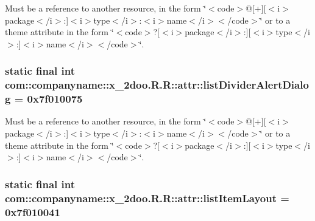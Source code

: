 Must be a reference to another resource, in the form \char`\"{}$<$code$>$@\mbox{[}+\mbox{]}\mbox{[}$<$i$>$package$<$/i$>$:\mbox{]}$<$i$>$type$<$/i$>$:$<$i$>$name$<$/i$>$$<$/code$>$\char`\"{} or to a theme attribute in the form \char`\"{}$<$code$>$?\mbox{[}$<$i$>$package$<$/i$>$:\mbox{]}\mbox{[}$<$i$>$type$<$/i$>$:\mbox{]}$<$i$>$name$<$/i$>$$<$/code$>$\char`\"{}. \hypertarget{classcom_1_1companyname_1_1x__2doo_1_1_r_1_1attr_3d36b2377163f3962672aaeabe780d8a}{
\subsubsection[{listDividerAlertDialog}]{\setlength{\rightskip}{0pt plus 5cm}static final int com::companyname::x\_\-2doo.R.R::attr::listDividerAlertDialog = 0x7f010075}}
\label{classcom_1_1companyname_1_1x__2doo_1_1_r_1_1attr_3d36b2377163f3962672aaeabe780d8a}


Must be a reference to another resource, in the form \char`\"{}$<$code$>$@\mbox{[}+\mbox{]}\mbox{[}$<$i$>$package$<$/i$>$:\mbox{]}$<$i$>$type$<$/i$>$:$<$i$>$name$<$/i$>$$<$/code$>$\char`\"{} or to a theme attribute in the form \char`\"{}$<$code$>$?\mbox{[}$<$i$>$package$<$/i$>$:\mbox{]}\mbox{[}$<$i$>$type$<$/i$>$:\mbox{]}$<$i$>$name$<$/i$>$$<$/code$>$\char`\"{}. \hypertarget{classcom_1_1companyname_1_1x__2doo_1_1_r_1_1attr_f6842dbe0e3f7f127a9c3fbfb45b0a8b}{
\subsubsection[{listItemLayout}]{\setlength{\rightskip}{0pt plus 5cm}static final int com::companyname::x\_\-2doo.R.R::attr::listItemLayout = 0x7f010041}}
\label{classcom_1_1companyname_1_1x__2doo_1_1_r_1_1attr_f6842dbe0e3f7f127a9c3fbfb45b0a8b}


